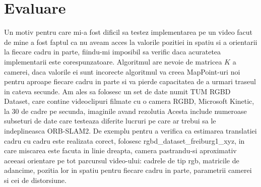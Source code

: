 \documentclass[12pt,a4paper]{report}
\begin{document}
\chapter{Evaluare}

Un motiv pentru care mi-a fost dificil
sa testez implementarea pe un video facut de mine a fost faptul ca nu aveam acces la valorile
pozitiei in spatiu si a orientarii la fiecare cadru in parte, fiindu-mi imposibil sa verific 
daca acuratetea implementarii este corespunzatoare. Algoritmul are nevoie de matricea \(K\) a   
camerei, daca valorile ei sunt incorecte algoritmul va creea MapPoint-uri noi pentru aproape
fiecare cadru in parte si va pierde capacitatea de a urmari traseul in cateva secunde. 
Am ales sa folosesc un set de date numit TUM RGBD Dataset, care contine videoclipuri filmate 
cu o camera RGBD, Microsoft Kinetic, la 30 de cadre pe secunda, imaginile avand rezolutia Acesta include numeroase 
subseturi de date care testeaza diferite lucruri pe care ar trebui sa le indeplineasca 
ORB-SLAM2. De exemplu pentru a verifica ca estimarea translatiei cadru cu cadru este realizata 
corect, folosesc rgbd\_dataset\_freiburg1\_xyz, in care miscarea este 
facuta in linie dreapta, camera pastrandu-si aproximativ aceeasi orientare pe tot parcursul video-ului: cadrele de tip rgb, matricile de adancime, pozitia lor in spatiu 
pentru fiecare cadru in parte, parametrii camerei si cei de distorsiune.     
\end{document}
